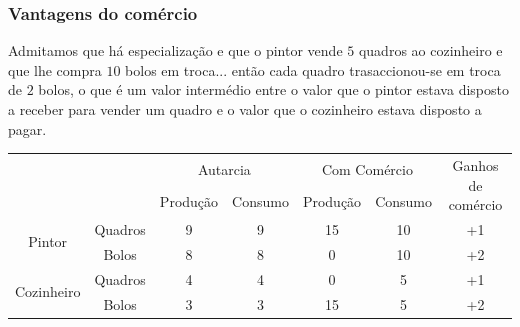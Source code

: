 \begin{frame}
	\frametitle{Vantagens do com\'ercio}
	{\small Admitamos que h\'a especializa\c c\~ao e que o pintor vende $5$ quadros ao cozinheiro e que lhe compra $10$ bolos em troca... ent\~ao cada quadro trasaccionou-se em troca de $2$ bolos, o que \'e um valor interm\'edio entre o valor que o pintor estava disposto a receber para vender um quadro e o valor que o cozinheiro estava disposto a pagar.}
	
	\begin{table}
		\begin{adjustbox}{max width = \textwidth}
		{\renewcommand{\arraystretch}{1.5}
		\begin{tabular}{ccccccc}
			\multicolumn{2}{c}{} & \multicolumn{2}{c}{Autarcia} & \multicolumn{2}{c}{Com Com\'ercio} & \multirow{2}{*}{\parbox{2cm}{Ganhos de com\'ercio}}\\
			\cline{3-4}\cline{5-6} 
			\multicolumn{2}{c}{} & Produ\c c\~ao & Consumo & Produ\c c\~ao & Consumo & \\
			\hline\hline
			\multirow{2}{*}{Pintor} & Quadros & 9 & 9 & 15 & 10 & +1 \\
								    & Bolos   & 8 & 8 & 0  & 10 & +2 \\
			\hline
			\multirow{2}{*}{Cozinheiro} & Quadros & 4 & 4 & 0 & 5 & +1 \\
										& Bolos & 3 & 3 & 15 & 5 & +2 \\
			\hline\hline
		\end{tabular}
		}
		\end{adjustbox}
	\end{table}
\end{frame}

